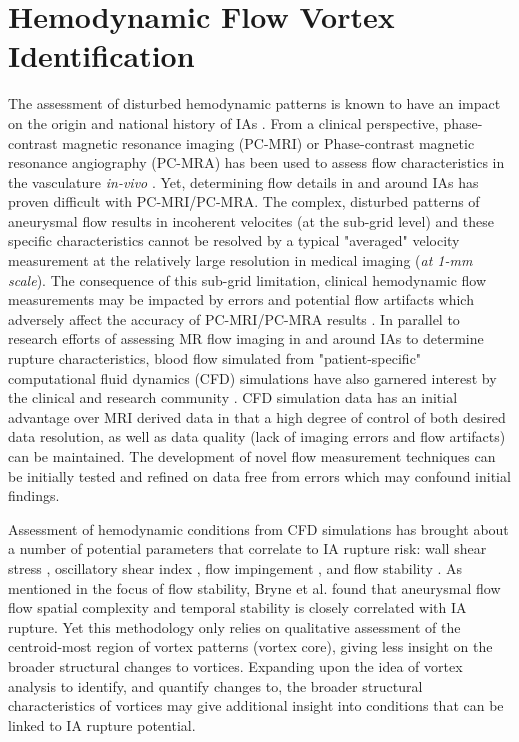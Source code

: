 \cleartooddpage[\thispagestyle{empty}]
\chapter{Hemodynamic Flow Vortex Identification}\label{CHAPTER3}

The assessment of disturbed hemodynamic patterns is known to have an impact on the origin and national history of IAs \cite{weir2002unruptured,brisman2006cerebral}. From a clinical perspective, phase-contrast magnetic resonance imaging (PC-MRI) or Phase-contrast magnetic resonance angiography (PC-MRA) has been used to assess flow characteristics in the vasculature \textit{in-vivo} \cite{benndorf1996intraaneurysmal,meckel2008vivo}. Yet, determining flow details in and around IAs has proven difficult with PC-MRI/PC-MRA. The complex, disturbed patterns of aneurysmal flow results in incoherent velocites (at the sub-grid level) and these specific characteristics cannot be resolved by a typical "averaged" velocity measurement at the relatively large resolution in medical imaging (\textit{at 1-mm scale}). The consequence of this sub-grid limitation, clinical hemodynamic flow measurements may be impacted by errors and potential flow artifacts which adversely affect the accuracy of PC-MRI/PC-MRA results \cite{strater20184d,meckel2008vivo}. In parallel to research efforts of assessing MR flow imaging in and around IAs to determine rupture characteristics, blood flow simulated from "patient-specific" computational fluid dynamics (CFD) simulations \cite{steinman2002image} have also garnered interest by the clinical and research community \cite{xiang2011hemodynamic,cebral2011association}. CFD simulation data has an initial advantage over MRI derived data in that a high degree of control of both desired data resolution, as well as data quality (lack of imaging errors and flow artifacts) can be maintained. The development of novel flow measurement techniques can be initially tested and refined on data free from errors which may confound initial findings.

Assessment of hemodynamic conditions from CFD simulations has brought about a number of potential parameters that correlate to IA rupture risk: wall shear stress \cite{baek2009flow}, oscillatory shear index \cite{steinman2003image}, flow impingement \cite{cebral2011association}, and flow stability \cite{byrne2014quantifying}. As mentioned in the focus of flow stability, Bryne et al. \cite{byrne2014quantifying} found that aneurysmal flow flow spatial complexity and temporal stability is closely correlated with IA rupture. Yet this methodology only relies on qualitative assessment of the centroid-most region of vortex patterns (vortex core), giving less insight on the broader structural changes to vortices. Expanding upon the idea of vortex analysis to identify, and quantify changes to, the broader structural characteristics of vortices may give additional insight into conditions that can be linked to IA rupture potential.

